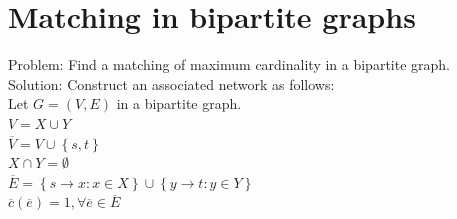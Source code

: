 \section{Matching in bipartite graphs}
Problem: Find a matching of maximum cardinality in a bipartite graph.\\
Solution: Construct an associated network as follows:\\
Let $G=(V,E)$ in a bipartite graph.\\ $V = X \cup Y$\\$\overline{V}=V \cup \left\{s,t\right\}$\\
$X\cap Y=\emptyset$\\$\overline{E}=\left\{s \rightarrow x: x \in X \right\}\cup \left\{ y \rightarrow t: y \in Y \right\}$\\
$\overline{c}(\overline{e})=1, \forall \overline{e} \in \overline{E}$

